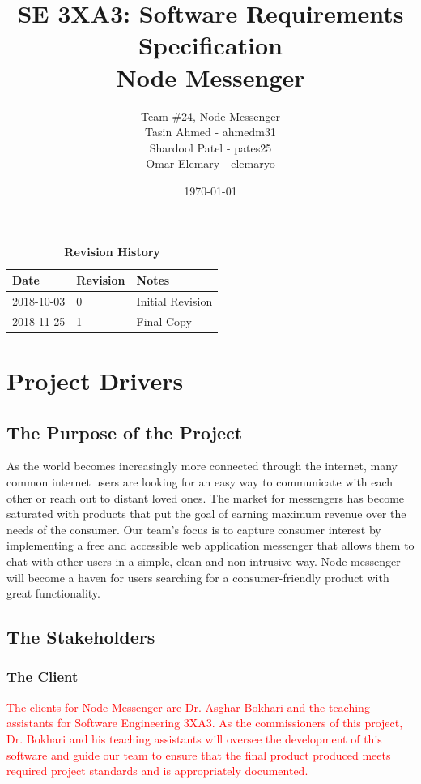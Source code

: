 \documentclass[12pt, titlepage]{article}
\title{SE 3XA3: Software Requirements Specification\\Node Messenger}
\author{Team \#24, Node Messenger
		\\ Tasin Ahmed - ahmedm31
		\\ Shardool Patel - pates25
		\\ Omar Elemary - elemaryo
}
\date{\today}
\begin{document}
    \maketitle

    \tableofcontents
    \listoftables
    \listoffigures

    \begin{table}[bp]
    \caption{\bf Revision History}
    \begin{tabularx}{\textwidth}{p{3cm}p{2cm}X}
    \toprule {\bf Date} & {\bf Revision} & {\bf Notes}\\
    \midrule
    2018-10-03 & 0 & Initial Revision\\
    2018-11-25 & 1 & Final Copy\\
    \bottomrule
    \end{tabularx}
    \end{table}

    \newpage



    \section{Project Drivers}

    	\subsection{The Purpose of the Project}
        As the world becomes increasingly more connected through the internet, many common internet users are looking for an easy way to communicate with each other or reach out to distant loved ones. The market for messengers has become saturated with products that put the goal of earning maximum revenue over the needs of the consumer. Our team’s focus is to capture consumer interest by implementing a free and accessible web application messenger that allows them to chat with other users in a simple, clean and non-intrusive way. Node messenger will become a haven for users searching for a consumer-friendly product with great functionality.
    	\subsection{The Stakeholders}

    		\subsubsection{The Client}
            \textcolor{red}{The clients for Node Messenger are Dr. Asghar Bokhari and the teaching assistants for Software Engineering 3XA3. As the commissioners of this project, Dr. Bokhari and his teaching assistants will oversee the development of this software and guide our team to ensure that the final product produced meets required project standards and is appropriately documented.}
\end{document}
